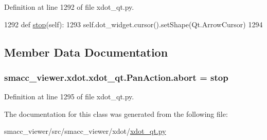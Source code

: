 Definition at line 1292 of file xdot\+\_\+qt.\+py.


\begin{DoxyCode}
1292     \textcolor{keyword}{def }\hyperlink{classsmacc__viewer_1_1xdot_1_1xdot__qt_1_1PanAction_adb2e94bf4ffbf40091c207c009596f31}{stop}(self):
1293         self.dot\_widget.cursor().setShape(Qt.ArrowCursor)
1294 
\end{DoxyCode}


\subsection{Member Data Documentation}
\subsubsection[{\texorpdfstring{abort}{abort}}]{\setlength{\rightskip}{0pt plus 5cm}smacc\+\_\+viewer.\+xdot.\+xdot\+\_\+qt.\+Pan\+Action.\+abort = {\bf stop}\hspace{0.3cm}{\ttfamily [static]}}\hypertarget{classsmacc__viewer_1_1xdot_1_1xdot__qt_1_1PanAction_a93ec1ab2c6f055ca7ed2b74220f9c900}{}\label{classsmacc__viewer_1_1xdot_1_1xdot__qt_1_1PanAction_a93ec1ab2c6f055ca7ed2b74220f9c900}


Definition at line 1295 of file xdot\+\_\+qt.\+py.



The documentation for this class was generated from the following file\+:\begin{DoxyCompactItemize}
\item 
smacc\+\_\+viewer/src/smacc\+\_\+viewer/xdot/\hyperlink{xdot__qt_8py}{xdot\+\_\+qt.\+py}\end{DoxyCompactItemize}
